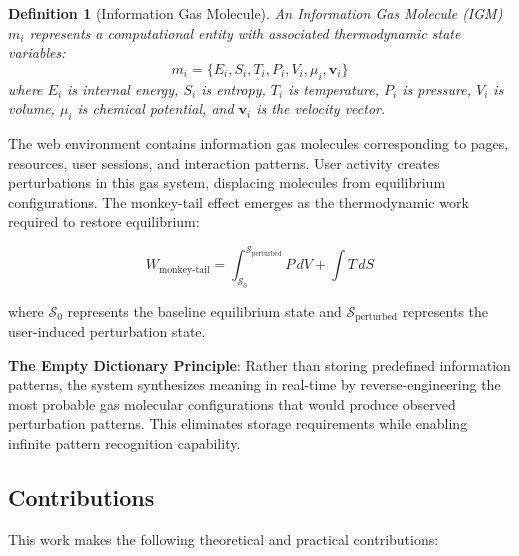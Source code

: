\documentclass[12pt,a4paper]{article}
\newtheorem{definition}{Definition}
\begin{document}
\begin{definition}[Information Gas Molecule]
An Information Gas Molecule (IGM) $m_i$ represents a computational entity with associated thermodynamic state variables:
\begin{equation}
m_i = \{E_i, S_i, T_i, P_i, V_i, \mu_i, \mathbf{v}_i\}
\end{equation}
where $E_i$ is internal energy, $S_i$ is entropy, $T_i$ is temperature, $P_i$ is pressure, $V_i$ is volume, $\mu_i$ is chemical potential, and $\mathbf{v}_i$ is the velocity vector.
\end{definition}

The web environment contains information gas molecules corresponding to pages, resources, user sessions, and interaction patterns. User activity creates perturbations in this gas system, displacing molecules from equilibrium configurations. The monkey-tail effect emerges as the thermodynamic work required to restore equilibrium:

\begin{equation}
W_{\text{monkey-tail}} = \int_{\mathcal{S}_0}^{\mathcal{S}_{\text{perturbed}}} P \, dV + \int T \, dS
\end{equation}

where $\mathcal{S}_0$ represents the baseline equilibrium state and $\mathcal{S}_{\text{perturbed}}$ represents the user-induced perturbation state.

\textbf{The Empty Dictionary Principle}: Rather than storing predefined information patterns, the system synthesizes meaning in real-time by reverse-engineering the most probable gas molecular configurations that would produce observed perturbation patterns. This eliminates storage requirements while enabling infinite pattern recognition capability.

\subsection{Contributions}

This work makes the following theoretical and practical contributions:
\end{document}
